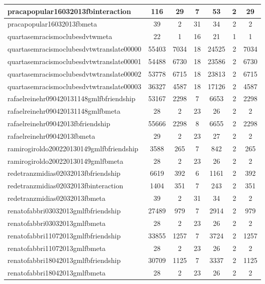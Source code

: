 \begin{table*}[h!]
\begin{center}
\begin{tabular}{| l | c | c | c | c | c | c |}
pracapopular16032013fbinteraction & 116  & 29  & 7  & 53  & 2  & 29 \\\hline
pracapopular16032013fbmeta & 39  & 2  & 31  & 34  & 2  & 2 \\\hline
quartasemracismoclubesdvtwmeta & 22  & 1  & 16  & 21  & 1  & 1 \\\hline
quartasemracismoclubesdvtwtranslate00000 & 55403  & 7034  & 18  & 24525  & 2  & 7034 \\\hline
quartasemracismoclubesdvtwtranslate00001 & 54488  & 6730  & 18  & 23586  & 2  & 6730 \\\hline
quartasemracismoclubesdvtwtranslate00002 & 53778  & 6715  & 18  & 23813  & 2  & 6715 \\\hline
quartasemracismoclubesdvtwtranslate00003 & 36327  & 4587  & 18  & 17126  & 2  & 4587 \\\hline
rafaelreinehr090420131148gmlfbfriendship & 53167  & 2298  & 7  & 6653  & 2  & 2298 \\\hline
rafaelreinehr090420131148gmlfbmeta & 28  & 2  & 23  & 26  & 2  & 2 \\\hline
rafaelreinehr09042013fbfriendship & 55666  & 2298  & 8  & 6655  & 2  & 2298 \\\hline
rafaelreinehr09042013fbmeta & 29  & 2  & 23  & 27  & 2  & 2 \\\hline
ramirogiroldo200220130149gmlfbfriendship & 3588  & 265  & 7  & 842  & 2  & 265 \\\hline
ramirogiroldo200220130149gmlfbmeta & 28  & 2  & 23  & 26  & 2  & 2 \\\hline
redetranzmidias02032013fbfriendship & 6619  & 392  & 6  & 1161  & 2  & 392 \\\hline
redetranzmidias02032013fbinteraction & 1404  & 351  & 7  & 243  & 2  & 351 \\\hline
redetranzmidias02032013fbmeta & 39  & 2  & 31  & 34  & 2  & 2 \\\hline
renatofabbri03032013gmlfbfriendship & 27489  & 979  & 7  & 2914  & 2  & 979 \\\hline
renatofabbri03032013gmlfbmeta & 28  & 2  & 23  & 26  & 2  & 2 \\\hline
renatofabbri11072013gmlfbfriendship & 33855  & 1257  & 7  & 3724  & 2  & 1257 \\\hline
renatofabbri11072013gmlfbmeta & 28  & 2  & 23  & 26  & 2  & 2 \\\hline
renatofabbri18042013gmlfbfriendship & 30709  & 1125  & 7  & 3337  & 2  & 1125 \\\hline
renatofabbri18042013gmlfbmeta & 28  & 2  & 23  & 26  & 2  & 2 \\\hline

\end{tabular}
\end{center}
\end{table*}
